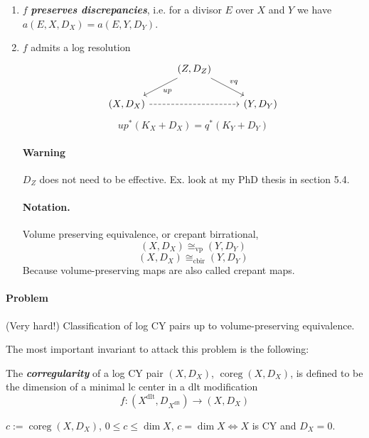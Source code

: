 \begin{defn}\leavevmode 
	\begin{enumerate}[label=(\roman*)]
		\item $f$ \textit{\textbf{preserves discrepancies}}, i.e. for a divisor  $E$ over $X$ and $Y$ we have $a(E,X,D_X)=a(E,Y,D_Y)$.

		\item $f$ admits a log resolution
			\[\begin{tikzcd}
				& (Z,D_Z)\arrow[dr,"vq"]\arrow[dl,"up"]\\
				(X,D_X)\arrow[rr,dashed]&&(Y,D_Y)
			\end{tikzcd}\]
			\[up^*(K_X+D_X)=q^*(K_Y+D_Y)\]

			\paragraph{Warning} $D_Z$ does not need to be effective. Ex. look at my PhD thesis in section 5.4.

			\paragraph{Notation.} Volume preserving equivalence, or crepant birrational,
			\[(X,D_X)\cong_{\operatorname{vp}}(Y,D_Y)\]
			\[(X,D_X)\cong_{\operatorname{cbir}}(Y,D_Y)\]
			Because volume-preserving maps are also called crepant maps.

	\end{enumerate}
\end{defn}

\paragraph{Problem} (Very hard!) Classification of log CY pairs up to volume-preserving equivalence.

The most important invariant to attack this problem is the following:

\begin{defn}
	The \textit{\textbf{corregularity}} of a log CY pair $(X,D_X)$, $\operatorname{coreg}(X,D_X)$, is defined to be the dimension of a minimal lc center in a dlt modification
	\[f:(X^{\operatorname{dlt}},D_{X^{\operatorname{dlt}}})\to (X,D_X)\]
\end{defn}

\begin{remark}
	$c:=\operatorname{coreg}(X,D_X)$, $0\leq c\leq \dim X$, $c=\dim X\iff X$ is CY and $D_X=0$.
\end{remark}

